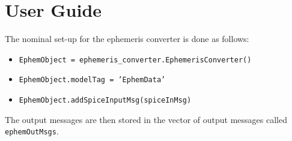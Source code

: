\section{User Guide}

The nominal set-up for the ephemeris converter is done as follows:

\begin{itemize}
\item[-]     \texttt{EphemObject = ephemeris\_converter.EphemerisConverter()}
\item[-]     \texttt{EphemObject.modelTag = 'EphemData'}
\item[-]     \texttt{EphemObject.addSpiceInputMsg(spiceInMsg)}
\end{itemize}
The output messages are then stored in the vector of output messages called {\tt ephemOutMsgs}.

